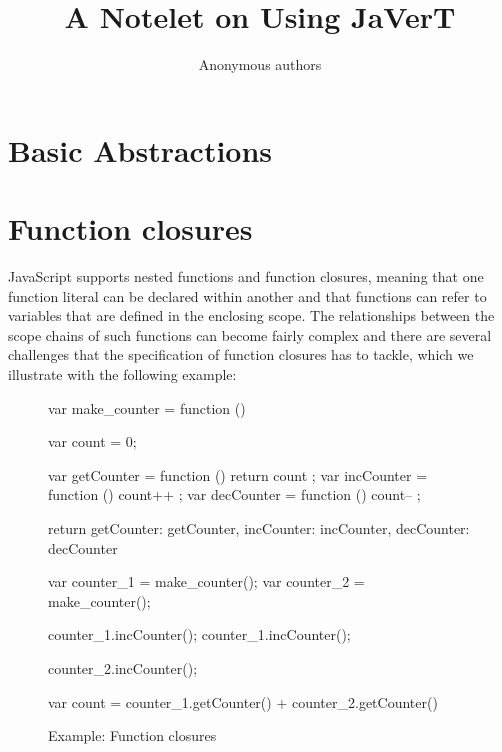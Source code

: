 \documentclass{llncs}
\begin{document}
\title{A Notelet on Using JaVerT}

\author{Anonymous authors}


\maketitle

\section{Basic Abstractions}

\newpage
\section{Function closures}
\label{sec:closures}

JavaScript supports nested functions and function closures, meaning that one function literal can be declared within another and that functions can refer to variables that are defined in the enclosing scope. 
The relationships between the scope chains of such functions can become fairly complex and there are several challenges that the specification of function closures has to tackle, which we illustrate with the following example:

\begin{figure}[!h]
\centering
\begin{minipage}{0.75\textwidth}
\begin{lstjs}[firstnumber=1]
var make_counter = function () {
   var count = 0;

   var getCounter = function () { return count };
   var incCounter = function () { count++ };
   var decCounter = function () { count-- };

   return { getCounter: getCounter, incCounter: incCounter, decCounter: decCounter }
}

var counter_1 = make_counter();
var counter_2 = make_counter();

counter_1.incCounter();
counter_1.incCounter();

counter_2.incCounter();

var count = counter_1.getCounter() + counter_2.getCounter()
\end{lstjs}
\end{minipage}
\vspace*{-0.2cm}
\caption{Example: Function closures}
\label{fig:fc}
\end{figure}
\end{document}
